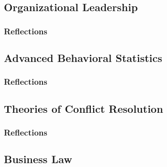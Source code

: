 \documentclass[12pt,titlepage]{article}
\begin{document}
\subsection{Organizational Leadership}
\subsubsection{Reflections}







\subsection{Advanced Behavioral Statistics}
\subsubsection{Reflections}

\subsection{Theories of Conflict Resolution}
\subsubsection{Reflections}





\subsection{Business Law}
\end{document}
